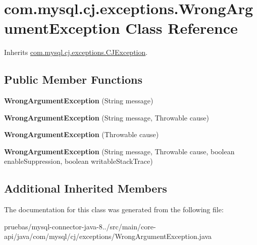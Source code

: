 \hypertarget{classcom_1_1mysql_1_1cj_1_1exceptions_1_1_wrong_argument_exception}{}\section{com.\+mysql.\+cj.\+exceptions.\+Wrong\+Argument\+Exception Class Reference}
\label{classcom_1_1mysql_1_1cj_1_1exceptions_1_1_wrong_argument_exception}


Inherits \mbox{\hyperlink{classcom_1_1mysql_1_1cj_1_1exceptions_1_1_c_j_exception}{com.\+mysql.\+cj.\+exceptions.\+C\+J\+Exception}}.

\subsection*{Public Member Functions}
\begin{DoxyCompactItemize}
\item 
\mbox{\label{classcom_1_1mysql_1_1cj_1_1exceptions_1_1_wrong_argument_exception_ae685c3d494cf24339b6b1cf3fa7bac5a}} 
{\bfseries Wrong\+Argument\+Exception} (String message)
\item 
\mbox{\label{classcom_1_1mysql_1_1cj_1_1exceptions_1_1_wrong_argument_exception_adb557eb40291f63d89329267edee30af}} 
{\bfseries Wrong\+Argument\+Exception} (String message, Throwable cause)
\item 
\mbox{\label{classcom_1_1mysql_1_1cj_1_1exceptions_1_1_wrong_argument_exception_a4bc38c75de10f7d0eca1685ceb9b8277}} 
{\bfseries Wrong\+Argument\+Exception} (Throwable cause)
\item 
\mbox{\label{classcom_1_1mysql_1_1cj_1_1exceptions_1_1_wrong_argument_exception_a327a1523bc3ebd7b311798ec390a591a}} 
{\bfseries Wrong\+Argument\+Exception} (String message, Throwable cause, boolean enable\+Suppression, boolean writable\+Stack\+Trace)
\end{DoxyCompactItemize}
\subsection*{Additional Inherited Members}


The documentation for this class was generated from the following file\+:\begin{DoxyCompactItemize}
\item 
pruebas/mysql-\/connector-\/java-\/8../src/main/core-\/api/java/com/mysql/cj/exceptions/Wrong\+Argument\+Exception.\+java\end{DoxyCompactItemize}
